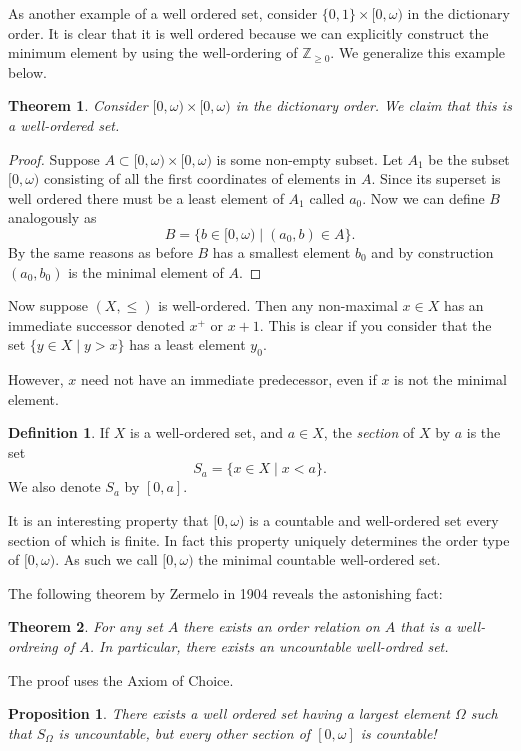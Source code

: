 \documentclass[12pt]{article}
\theoremstyle{plain}
\newtheorem{theorem}{Theorem}
\newtheorem{proposition}{Proposition}
\theoremstyle{definition}
\newtheorem{definition}{Definition}
\begin{document}
As another example of a well ordered set, consider $\{0, 1\} \times [0, \omega)$ in the dictionary order. It is clear that it is well ordered because we can explicitly construct the minimum element by using the well-ordering of $\mathbb{Z}_{\geq 0}$. We generalize this example below.

\begin{theorem}
Consider $[0, \omega) \times [0, \omega)$ in the dictionary order. We claim that this is a well-ordered set.
\end{theorem}
\begin{proof}
Suppose $A \subset [0, \omega) \times [0, \omega)$ is some non-empty subset. Let $A_1$ be the subset $[0, \omega)$ consisting of all the first coordinates of elements in $A$. Since its superset is well ordered there must be a least element of $A_1$ called $a_0$. Now we can define $B$ analogously as 
\[B = \{b \in [0,\omega) \mid (a_0, b) \in A\}.\]
By the same reasons as before $B$ has a smallest element $b_0$ and by construction $(a_0, b_0)$ is the minimal element of $A$.
\end{proof}

Now suppose $(X, \leq)$ is well-ordered. Then any non-maximal $x \in X$ has an immediate successor denoted $x^+$ or $x + 1$. This is clear if you consider that the set $\{y \in X \mid y > x\}$ has a least element $y_0$.

However, $x$ need not have an immediate predecessor, even if $x$ is not the minimal element.

\begin{definition}
	If $X$ is a well-ordered set, and $a \in X$, the \textit{section} of $X$ by $a$ is the set 
	\[S_a = \{x \in X \mid x < a\}.\] We also denote $S_a$ by $[0, a]$.
\end{definition}

It is an interesting property that $[0, \omega)$ is a countable and well-ordered set every section of which is finite. In fact this property uniquely determines the order type of $[0, \omega)$. As such we call $[0, \omega)$ the minimal countable well-ordered set.

The following theorem by Zermelo in 1904 reveals the astonishing fact:
\begin{theorem}
For any set $A$ there exists an order relation on $A$ that is a well-ordreing of $A$. In particular, there exists an uncountable well-ordred set.
\end{theorem}
The proof uses the Axiom of Choice.

\begin{proposition}
There exists a well ordered set having a largest element $\Omega$ such that $S_{\Omega}$ is uncountable, but every other section of $[0, \omega]$ is countable!
\end{proposition}
\end{document}
